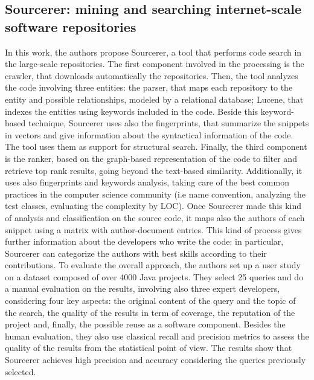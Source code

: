 \subsection{Sourcerer: mining and searching internet-scale software repositories}
In this work, the authors propose Sourcerer, a tool that performs code search in the large-scale repositories. The first component involved in the processing is the crawler, that downloads automatically the repositories. Then, the tool analyzes the code involving three entities: the parser, that maps each repository to the entity and possible relationships, modeled by a relational database; Lucene, that indexes the entities using keywords included in the code. Beside this keyword-based technique, Sourcerer uses also the fingerprints, that summarize the snippets in vectors and give information about the syntactical information of the code. The tool uses them as support for structural search.  Finally, the third component is the ranker, based on the graph-based representation of the code to filter and retrieve top rank results, going beyond the text-based similarity. Additionally, it uses also fingerprints and keywords analysis, taking care of the best common practices in the computer science community (i.e name convention, analyzing the test classes, evaluating the complexity by LOC). Once Sourcerer made this kind of analysis and classification on the source code,  it maps also the authors of each snippet using a matrix with author-document entries. This kind of process gives further information about the developers who write the code: in particular, Sourcerer can categorize the authors with best skills according to their contributions. To evaluate the overall approach, the authors set up a user study on a dataset composed of over 4000 Java projects. They select 25 queries and do a manual evaluation  on the results, involving also three expert developers, considering four key aspects: the original content of the query and the topic of the search, the quality of the results in term of coverage, the reputation of the project and, finally, the possible reuse as a software component. Besides the human evaluation, they also use classical recall and precision metrics to assess the quality of the results from the statistical point of view. The results show that Sourcerer achieves high precision and accuracy considering the queries previously selected. 

